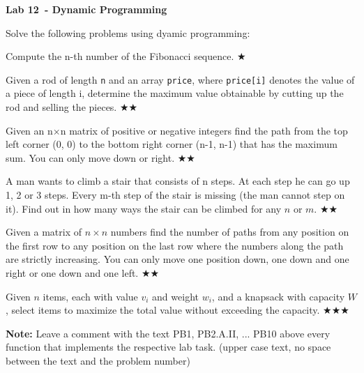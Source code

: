 \documentclass{exam}
\newcommand\labnr{12}
\newcommand\lab{Lab \labnr\ - Dynamic Programming}
\newcommand\lvlez{$\bigstar$}
\newcommand\lvlmed{\lvlez\lvlez}
\newcommand\lvlhard{\lvlmed\lvlez}
\begin{document}
\begin{center}
    \vspace*{0cm}
    \bfseries\LARGE
    \lab
    \vspace*{1cm}
\end{center}

\noindent Solve the following problems using dyamic programming:
\begin{questions}
\item Compute the n-th number of the Fibonacci sequence. \lvlez
\item Given a rod of length \verb|n| and an array \verb|price|, where \verb|price[i]| denotes the value of a piece of length i, determine the maximum value obtainable by cutting up the rod and selling the pieces. \lvlmed
\item  Given an n$\times$n matrix of positive or negative integers find the path from the top left corner (0, 0) to the bottom right corner (n-1, n-1) that has the maximum sum. You can only move down or right. \lvlmed
\item A man wants to climb a stair that consists of n steps.
    At each step he can go up 1, 2 or 3 steps.
    Every m-th step of the stair is missing (the man cannot step on it). 
    Find out in how many ways the stair can be climbed for any $n$ or $m$.
    \lvlmed
\item  Given a matrix of $n \times n$ numbers find the number of paths from any position on the first row to any position on the last row where the numbers along the path are strictly increasing. You can only move one position down, one down and one right or one down and one left. \lvlmed

\item Given $n$ items, each with value $v_i$ and weight $w_i$, and a knapsack with capacity $W$, select items to maximize the total value without exceeding the capacity. \lvlhard
    
\end{questions}

 \bigskip
\textbf{Note:} Leave a comment with the text PB1, PB2.A.II, ... PB10 above every function that implements the respective lab task. (upper case text, no space between the text and the problem number)

\medskip
\printbibliography
\end{document}
